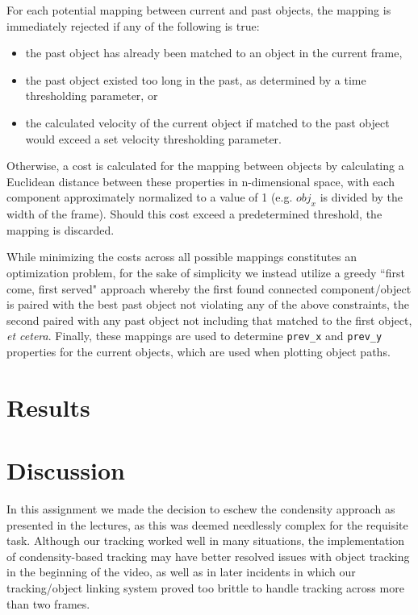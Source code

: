 \documentclass[12pt,a4paper]{article}
\begin{document}
For each potential mapping between current and past objects, the mapping is immediately rejected if any of the following is true:
\begin{itemize}
\item the past object has already been matched to an object in the current frame,
\item the past object existed too long in the past, as determined by a time thresholding parameter, or
\item the calculated velocity of the current object if matched to the past object would exceed a set velocity thresholding parameter.
\end{itemize}
Otherwise, a cost is calculated for the mapping between objects by calculating a Euclidean distance between these properties in n-dimensional space, with each component approximately normalized to a value of 1 (e.g. $obj_{x}$ is divided by the width of the frame). Should this cost exceed a predetermined threshold, the mapping is discarded.

While minimizing the costs across all possible mappings constitutes an optimization problem, for the sake of simplicity we instead utilize a greedy ``first come, first served" approach whereby the first found connected component/object is paired with the best past object not violating any of the above constraints, the second paired with any past object not including that matched to the first object, \textit{et cetera}. Finally, these mappings are used to determine \texttt{prev\_x} and \texttt{prev\_y} properties for the current objects, which are used when plotting object paths.

\section{Results}

\section{Discussion}
In this assignment we made the decision to eschew the condensity approach as presented in the lectures, as this was deemed needlessly complex for the requisite task. Although our tracking worked well in many situations, the implementation of condensity-based tracking may have better resolved issues with object tracking in the beginning of the video, as well as in later incidents in which our tracking/object linking system proved too brittle to handle tracking across more than two frames.
\end{document}
